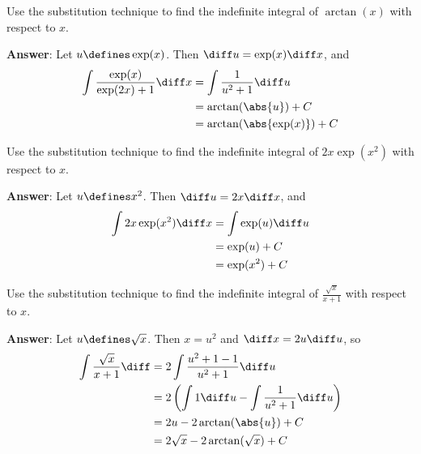 \begin{exm}\label{exm-integration-using-substitution:1}
	Use the substitution technique to find the indefinite integral of $\arctan(x)$ with respect to $x$.
	\begin{flushleft}
		\textbf{Answer}: Let $u \defines \exp(x)$. Then $\diff u = \exp(x) \diff x$, and
		\begin{align*}
			\int \frac{\exp(x)}{\exp(2x)+1} \diff x & = \int \frac{1}{u^2+1} \diff u \\
			                                        & = \arctan(\abs{u}) + C         \\
			                                        & = \arctan(\abs{\exp(x)}) + C
		\end{align*}
	\end{flushleft}
\end{exm}

\begin{exm}\label{exm-integration-using-substitution:2}
	Use the substitution technique to find the indefinite integral of $2x\exp(x^2)$ with respect to $x$.
	\begin{flushleft}
		\textbf{Answer}: Let $u \defines x^2$. Then $\diff u = 2x \diff x$, and
		\begin{align*}
			\int 2x\exp(x^2) \diff x & = \int \exp(u) \diff u \\
			                         & = \exp(u) + C          \\
			                         & = \exp(x^2) + C
		\end{align*}
	\end{flushleft}
\end{exm}

\begin{exm}\label{exm-integration-using-substitution:3}
	Use the substitution technique to find the indefinite integral of $\tfrac{\sqrt{x}}{x+1}$ with respect to $x$.
	\begin{flushleft}
		\textbf{Answer}: Let $u \defines \sqrt{x}$. Then $x = u^2$ and $\diff x = 2u \diff u$, so
		\begin{align*}
			\int \frac{\sqrt{x}}{x+1} \diff & = 2\int \frac{u^2+1-1}{u^2+1} \diff u                          \\
			                                & = 2 \left(\int 1 \diff u - \int \frac{1}{u^2+1} \diff u\right) \\
			                                & = 2u - 2\arctan(\abs{u}) + C                                   \\
			                                & = 2\sqrt{x} - 2\arctan(\sqrt{x}) + C
		\end{align*}
	\end{flushleft}
\end{exm}

